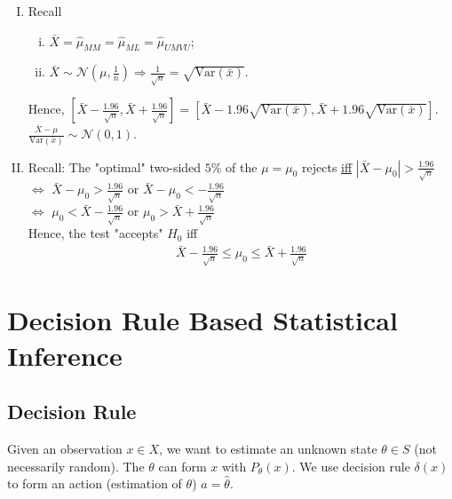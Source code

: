 \documentclass[11pt]{elegantbook}
\begin{document}
\begin{enumerate}[(I).]
    \item Recall
    \begin{enumerate}[(i).]
        \item $\bar{X}=\hat{\mu}_{MM}=\hat{\mu}_{ML}=\hat{\mu}_{UMVU}$;
        \item $\bar{X}\sim \mathcal{N}(\mu,\frac{1}{n}) \Rightarrow \frac{1}{\sqrt{n}}=\sqrt{\text{Var}(\bar{x})}$.
    \end{enumerate}
    Hence, $\left[\bar{X}-\frac{1.96}{\sqrt{n}},\bar{X}+\frac{1.96}{\sqrt{n}}\right]=\left[\bar{X}-1.96\sqrt{\text{Var}(\bar{x})},\bar{X}+1.96\sqrt{\text{Var}(\bar{x})}\right]$. $\frac{\bar{X}-\mu}{\text{Var}(\bar{x})}\sim \mathcal{N}(0,1)$.
    \item Recall: The "optimal" two-sided $5\%$ of the $\mu=\mu_0$ rejects \underline{iff} $|\bar{X}-\mu_0|>\frac{1.96}{\sqrt{n}}$\\
    $\Leftrightarrow$ $\bar{X}-\mu_0>\frac{1.96}{\sqrt{n}}$ or $\bar{X}-\mu_0<-\frac{1.96}{\sqrt{n}}$\\
    $\Leftrightarrow$ $\mu_0<\bar{X}-\frac{1.96}{\sqrt{n}}$ or $\mu_0>\bar{X}+\frac{1.96}{\sqrt{n}}$\\
    Hence, the test "accepts" $H_0$ iff
    \begin{equation}
        \begin{aligned}
            \bar{X}-\frac{1.96}{\sqrt{n}}\leq \mu_0\leq \bar{X}+\frac{1.96}{\sqrt{n}}
        \end{aligned}
        \nonumber
    \end{equation}
\end{enumerate}


\chapter{Decision Rule Based Statistical Inference}
\section{Decision Rule}
Given an observation $x\in X$, we want to estimate an unknown state $\theta \in S$ (not necessarily random). The $\theta$ can form $x$ with $P_\theta(x)$. We use decision rule $\delta (x)$ to form an action (estimation of $\theta$) $a=\hat{\theta}$.
\end{document}
